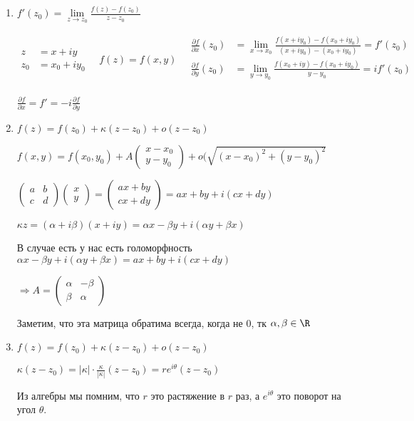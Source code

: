 \begin{remark}\thmslashn
	
	\begin{enumerate}
		\item 
		$f'(z_0) = \lim\limits_{z \to z_0} \frac{f(z) - f(z_0)}{z - z_0}$
		
		$\begin{aligned}
		z &= x + iy\\
		z_0 & = x_0 + iy_0
		\end{aligned} \quad f(z) = f(x, y)\quad 
		\begin{aligned}
		\frac{\partial f}{\partial x}(z_0) &= \lim\limits_{x \to x_0} \frac{f(x + iy_0) - f(x_0 + iy_0)}{(x + iy_0) - (x_0 + iy_0)} = f'(z_0)\\
		\frac{\partial f}{\partial y}(z_0) &= \lim\limits_{y \to y_0} \frac{f(x_0 + iy) - f(x_0 + iy_0)}{y -y_0} = if'(z_0)\\
		\end{aligned} 
		$
		
		$\frac{\partial f}{\partial x} = f' = -i\frac{\partial f}{\partial y}$
		
		\item
		$f(z) = f(z_0) + \kappa(z - z_0) + o(z-z_0)$
		
		$f(x, y) = f(x_0, y_0) + A\begin{pmatrix} x - x_0\\ y - y_0 \end{pmatrix} + o(\sqrt{(x-x_0)^2 + (y-y_0)^2}$
		
		$
		\begin{pmatrix}
			a & b\\
			c & d
		\end{pmatrix}
		\begin{pmatrix}
		x\\
		y
		\end{pmatrix} =
		\begin{pmatrix}
		ax + by\\
		cx + dy
		\end{pmatrix} = ax + by + i(cx+ dy)
		$
		
		$\kappa z = (\alpha + i\beta)(x + iy) = \alpha x - \beta y + i(\alpha y + \beta x)$
		
		В случае есть у нас есть голоморфность $\alpha x - \beta y + i(\alpha y + \beta x) = ax + by + i(cx+ dy)$
		
		$\Rightarrow A = \begin{pmatrix}
		\alpha & -\beta\\
		\beta & \alpha
		\end{pmatrix}$ 
		
		Заметим, что эта матрица обратима всегда, когда не 0, тк $\alpha, \beta \in \R$
		
		\item
		$f(z) = f(z_0) + \kappa(z - z_0) + o(z - z_0)$
		
		$\kappa(z - z_0) = |\kappa|\cdot\frac{\kappa}{|\kappa|}(z-z_0) = re^{i\theta}(z-z_0)$
		
		Из алгебры мы помним, что $r$ это растяжение в $r$ раз, а $e^{i\theta}$ это поворот на угол $\theta$.
		
	\end{enumerate}
	
\end{remark}
